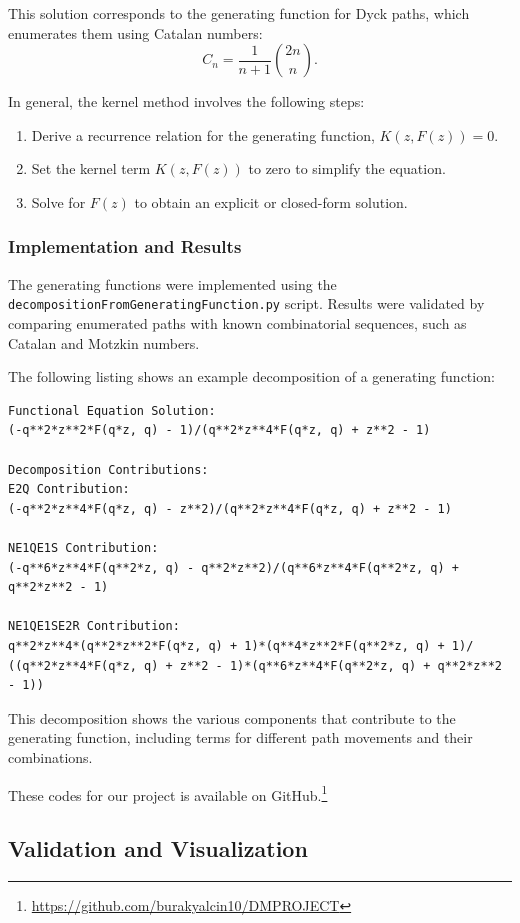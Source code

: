 \documentclass{article}
\begin{document}
This solution corresponds to the generating function for Dyck paths, which enumerates them using Catalan numbers:
\[
C_n = \frac{1}{n+1} \binom{2n}{n}.
\]

In general, the kernel method involves the following steps:
\begin{enumerate}
    \item Derive a recurrence relation for the generating function, $K(z, F(z)) = 0$.
    \item Set the kernel term $K(z, F(z))$ to zero to simplify the equation.
    \item Solve for $F(z)$ to obtain an explicit or closed-form solution.
\end{enumerate}


\subsubsection{Implementation and Results}
The generating functions were implemented using the \texttt{decompositionFromGeneratingFunction.py} script. Results were validated by comparing enumerated paths with known combinatorial sequences, such as Catalan and Motzkin numbers.

The following listing shows an example decomposition of a generating function:

\begin{lstlisting}[caption={Generating function decomposition for Dyck and Motzkin paths},label={lst:decomposition}]
Functional Equation Solution:
(-q**2*z**2*F(q*z, q) - 1)/(q**2*z**4*F(q*z, q) + z**2 - 1)

Decomposition Contributions:
E2Q Contribution: 
(-q**2*z**4*F(q*z, q) - z**2)/(q**2*z**4*F(q*z, q) + z**2 - 1)

NE1QE1S Contribution: 
(-q**6*z**4*F(q**2*z, q) - q**2*z**2)/(q**6*z**4*F(q**2*z, q) + q**2*z**2 - 1)

NE1QE1SE2R Contribution:
q**2*z**4*(q**2*z**2*F(q*z, q) + 1)*(q**4*z**2*F(q**2*z, q) + 1)/
((q**2*z**4*F(q*z, q) + z**2 - 1)*(q**6*z**4*F(q**2*z, q) + q**2*z**2 - 1))
\end{lstlisting}

This decomposition shows the various components that contribute to the generating function, including terms for different path movements and their combinations.

These codes for our project is available on GitHub.\footnote{\url{https://github.com/burakyalcin10/DMPROJECT}}

\subsection{Validation and Visualization}
\end{document}
